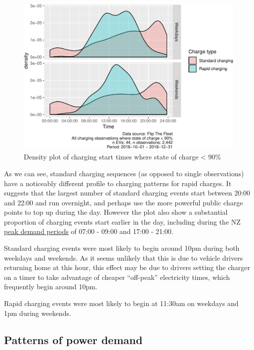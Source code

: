\documentclass[]{article}
\begin{document}
\begin{figure}
\centering
\includegraphics{EVBB_report_v1_files/figure-latex/chargeBeginsTimeDensity-1.pdf}
\caption{\label{fig:chargeBeginsTimeDensity}Density plot of charging start times where state of charge \textless{} 90\%}
\end{figure}

As we can see, standard charging sequences (as opposed to single observations) have a noticeably different profile to charging patterns for rapid charges. It suggests that the largest number of standard charging events start between 20:00 and 22:00 and run overnight, and perhaps use the more powerful public charge points to top up during the day. However the plot also show a substantial proportion of charging events start earlier in the day, including during the NZ \href{https://www.electrickiwi.co.nz/hour-of-power}{peak demand periods} of 07:00 - 09:00 and 17:00 - 21:00.

Standard charging events were most likely to begin around 10pm during both weekdays and weekends. As it seems unlikely that this is due to vehicle drivers returning home at this hour, this effect may be due to drivers setting the charger on a timer to take advantage of cheaper ``off-peak'' electricity times, which frequently begin around 10pm.

Rapid charging events were most likely to begin at 11:30am on weekdays and 1pm during weekends.

\hypertarget{patterns-of-power-demand}{%
\subsection{Patterns of power demand}\label{patterns-of-power-demand}}
\end{document}
